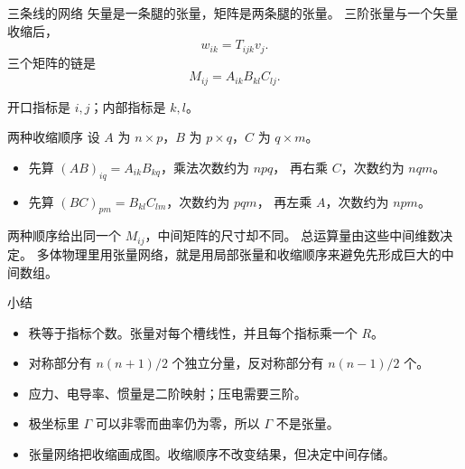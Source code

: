 \documentclass[fontset=windows, chinese, 10pt, xcolor=dvipsnames]{beamer}
\begin{document}
\begin{frame}{三条线的网络}
  矢量是一条腿的张量，矩阵是两条腿的张量。
  三阶张量与一个矢量收缩后，
  \begin{equation*}
    w_{ik}=T_{ijk}v_j.
  \end{equation*}
  三个矩阵的链是
  \begin{equation*}
    M_{ij}=A_{ik}B_{kl}C_{lj}.
  \end{equation*}
  \centering
  \vspace{0.3em}

  {\small 开口指标是 $i,j$；内部指标是 $k,l$。}
\end{frame}

\begin{frame}{两种收缩顺序}
  设 $A$ 为 $n\times p$，$B$ 为 $p\times q$，$C$ 为 $q\times m$。
  \begin{itemize}
    \item 先算 $(AB)_{iq}=A_{ik}B_{kq}$，乘法次数约为 $npq$，
      再右乘 $C$，次数约为 $nqm$。
    \item 先算 $(BC)_{pm}=B_{kl}C_{lm}$，次数约为 $pqm$，
      再左乘 $A$，次数约为 $npm$。
  \end{itemize}
  两种顺序给出同一个 $M_{ij}$，中间矩阵的尺寸却不同。
  总运算量由这些中间维数决定。
  多体物理里用张量网络，就是用局部张量和收缩顺序来避免先形成巨大的中间数组。
\end{frame}

\begin{frame}{小结}
  \begin{itemize}
    \item 秩等于指标个数。张量对每个槽线性，并且每个指标乘一个 $R$。
    \item 对称部分有 $n(n+1)/2$ 个独立分量，反对称部分有 $n(n-1)/2$ 个。
    \item 应力、电导率、惯量是二阶映射；压电需要三阶。
    \item 极坐标里 $\Gamma$ 可以非零而曲率仍为零，所以 $\Gamma$ 不是张量。
    \item 张量网络把收缩画成图。收缩顺序不改变结果，但决定中间存储。
  \end{itemize}
\end{frame}
\end{document}
